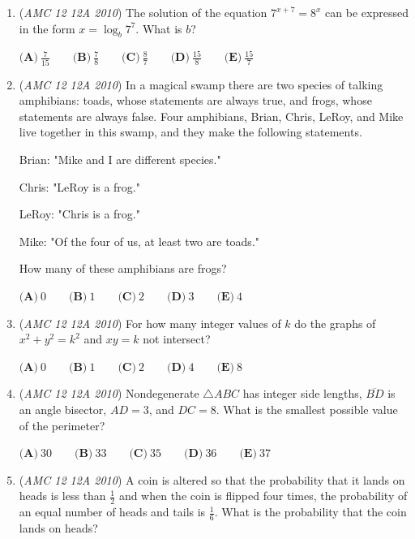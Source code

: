 \begin{enumerate}
 $\textbf{(A)}\ 8041 \qquad \textbf{(B)}\ 8043 \qquad \textbf{(C)}\ 8045 \qquad \textbf{(D)}\ 8047 \qquad \textbf{(E)}\ 8049$


	\item (\textit{AMC 12 12A 2010}) The solution of the equation $7^{x+7} = 8^x$ can be expressed in the form $x = \log_b 7^7$. What is $b$?


 $\textbf{(A)}\ \frac{7}{15} \qquad \textbf{(B)}\ \frac{7}{8} \qquad \textbf{(C)}\ \frac{8}{7} \qquad \textbf{(D)}\ \frac{15}{8} \qquad \textbf{(E)}\ \frac{15}{7}$


	\item (\textit{AMC 12 12A 2010}) In a magical swamp there are two species of talking amphibians: toads, whose statements are always true, and frogs, whose statements are always false. Four amphibians, Brian, Chris, LeRoy, and Mike live together in this swamp, and they make the following statements.


 Brian: "Mike and I are different species."


 Chris: "LeRoy is a frog."


 LeRoy: "Chris is a frog."


 Mike: "Of the four of us, at least two are toads."


 How many of these amphibians are frogs?


 $\textbf{(A)}\ 0 \qquad \textbf{(B)}\ 1 \qquad \textbf{(C)}\ 2 \qquad \textbf{(D)}\ 3 \qquad \textbf{(E)}\ 4$


	\item (\textit{AMC 12 12A 2010}) For how many integer values of $k$ do the graphs of $x^2+y^2=k^2$ and $xy = k$ not intersect?


 $\textbf{(A)}\ 0 \qquad \textbf{(B)}\ 1 \qquad \textbf{(C)}\ 2 \qquad \textbf{(D)}\ 4 \qquad \textbf{(E)}\ 8$


	\item (\textit{AMC 12 12A 2010}) Nondegenerate $\triangle ABC$ has integer side lengths, $\overline{BD}$ is an angle bisector, $AD = 3$, and $DC=8$. What is the smallest possible value of the perimeter?


 $\textbf{(A)}\ 30 \qquad \textbf{(B)}\ 33 \qquad \textbf{(C)}\ 35 \qquad \textbf{(D)}\ 36 \qquad \textbf{(E)}\ 37$


	\item (\textit{AMC 12 12A 2010}) A coin is altered so that the probability that it lands on heads is less than $\frac{1}{2}$ and when the coin is flipped four times, the probability of an equal number of heads and tails is $\frac{1}{6}$. What is the probability that the coin lands on heads?



\end{enumerate}
